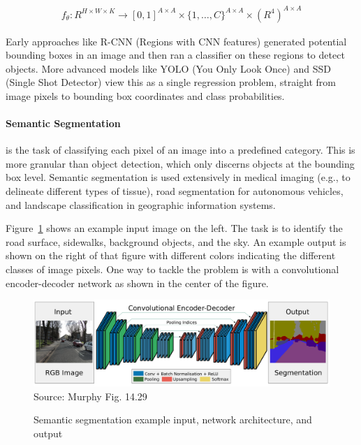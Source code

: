 \begin{align*}
f_\theta: R^{H\times W \times K} \rightarrow [0,1]^{A \times A} \times \{1, \ldots, C\}^{A \times A} \times (R^4)^{A \times A}
\end{align*}


Early approaches like R-CNN (Regions with CNN features) generated potential bounding boxes in an image and then ran a classifier on these regions to detect objects. More advanced models like YOLO (You Only Look Once) and SSD (Single Shot Detector) view this as a single regression problem, straight from image pixels to bounding box coordinates and class probabilities.

\paragraph*{Semantic Segmentation} is the task of classifying each pixel of an image into a predefined category. This is more granular than object detection, which only discerns objects at the bounding box level. Semantic segmentation is used extensively in medical imaging (e.g., to delineate different types of tissue), road segmentation for autonomous vehicles, and landscape classification in geographic information systems.

Figure~\ref{fig:screen11_chap16} shows an example input image on the left. The task is to identify the road surface, sidewalks, background objects, and the sky. An example output is shown on the right of that figure with different colors indicating the different classes of image pixels. One way to tackle the problem is with a convolutional encoder-decoder network as shown in the center of the figure.

\begin{figure}
\centering
\includegraphics[width=.9\textwidth]{screen11.png} \\

\scriptsize Source: Murphy Fig. 14.29
\normalsize
\caption{Semantic segmentation example input, network architecture, and output}
\label{fig:screen11_chap16}
\end{figure}

